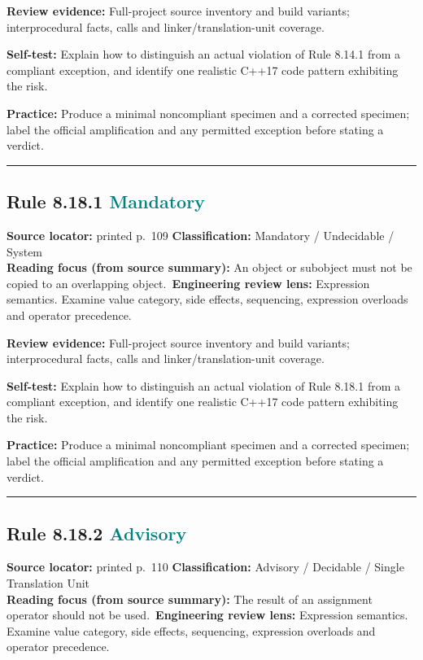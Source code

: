 \documentclass[10pt,letterpaper]{article}
\begin{document}
\textbf{Review evidence:} Full-project source inventory and build variants; interprocedural facts, calls and linker/translation-unit coverage.

\textbf{Self-test:} Explain how to distinguish an actual violation of Rule 8.14.1 from a compliant exception, and identify one realistic C++17 code pattern exhibiting the risk.\par
\textbf{Practice:} Produce a minimal noncompliant specimen and a corrected specimen; label the official amplification and any permitted exception before stating a verdict.
\smallskip\hrule\smallskip
\subsection*{Rule 8.18.1 \enspace \texorpdfstring{\small\textcolor{teal}{Mandatory}}{Mandatory}}
\noindent\textbf{Source locator:} printed p.~109 \quad\textbf{Classification:} Mandatory / Undecidable / System\\
\textbf{Reading focus (from source summary):} An object or subobject must not be copied to an overlapping object.\
\textbf{Engineering review lens:} Expression semantics. Examine value category, side effects, sequencing, expression overloads and operator precedence.

\textbf{Review evidence:} Full-project source inventory and build variants; interprocedural facts, calls and linker/translation-unit coverage.

\textbf{Self-test:} Explain how to distinguish an actual violation of Rule 8.18.1 from a compliant exception, and identify one realistic C++17 code pattern exhibiting the risk.\par
\textbf{Practice:} Produce a minimal noncompliant specimen and a corrected specimen; label the official amplification and any permitted exception before stating a verdict.
\smallskip\hrule\smallskip
\subsection*{Rule 8.18.2 \enspace \texorpdfstring{\small\textcolor{teal}{Advisory}}{Advisory}}
\noindent\textbf{Source locator:} printed p.~110 \quad\textbf{Classification:} Advisory / Decidable / Single Translation Unit\\
\textbf{Reading focus (from source summary):} The result of an assignment operator should not be used.\
\textbf{Engineering review lens:} Expression semantics. Examine value category, side effects, sequencing, expression overloads and operator precedence.
\end{document}
